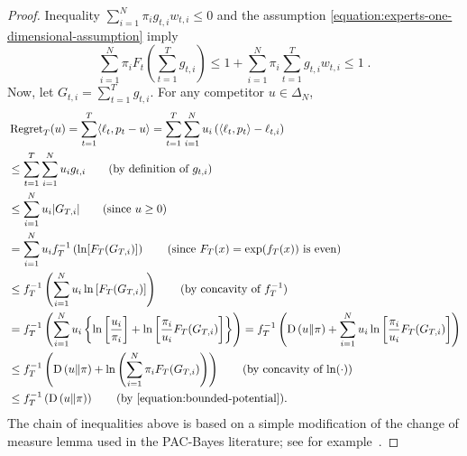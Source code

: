 \begin{proof}
Inequality $\sum_{i=1}^N \pi_i g_{t,i} w_{t,i} \le 0$ and the assumption
\eqref{equation:experts-one-dimensional-assumption} imply
\begin{equation}
\label{equation:bounded-potential}
\sum_{i=1}^N  \pi_i F_t \left(\sum_{t=1}^T g_{t,i} \right) \le 1 + \sum_{i=1}^N \pi_i \sum_{t=1}^T  g_{t,i} w_{t,i} \le 1 \; .
\end{equation}
Now, let $G_{t,i} =
\sum_{t=1}^T g_{t,i}$. For any competitor $u \in \Delta_N$,
\begingroup
\allowdisplaybreaks
\begin{align*}
\allowdisplaybreaks
&\Regret_T(u)
= \sum_{t=1}^T \langle \ell_t, p_t - u \rangle
= \sum_{t=1}^T \sum_{i=1}^N u_i \left( \langle \ell_t, p_t \rangle - \ell_{t,i} \right) \\
& \le \sum_{t=1}^T \sum_{i=1}^N u_i g_{t,i} \qquad \text{(by definition of $g_{t,i}$)} \\
& \le \sum_{i=1}^N u_i |G_{T,i}| \qquad \text{(since $u \ge 0$)}  \\
& = \sum_{i=1}^N u_i f_T^{-1}\left(\ln [F_T(G_{T,i})] \right)  \qquad \text{(since $F_T(x) = \exp(f_T(x))$ is even)} \\
& \le f_T^{-1}\left(\sum_{i=1}^N u_i \ln \left[ F_T(G_{T,i}) \right]\right) \qquad \text{(by concavity of $f_T^{-1}$)} \\
& = f_T^{-1}\left(\sum_{i=1}^N u_i \left\{\ln \left[\frac{u_i}{\pi_i}\right] +\ln \left[ \frac{\pi_i}{u_i} F_T(G_{T,i}) \right] \right\} \right)
= f_T^{-1}\left(\KL{u}{\pi}+\sum_{i=1}^N u_i\ln \left[\frac{\pi_i}{u_i} F_T(G_{T,i}) \right]\right) \\
& \le f_T^{-1}\left(\KL{u}{\pi}+\ln \left(\sum_{i=1}^N \pi_i F_T(G_{T,i}) \right)\right) \qquad \text{(by concavity of $\ln(\cdot)$)} \\
& \le f_T^{-1}\left(\KL{u}{\pi}\right) \qquad \text{(by \eqref{equation:bounded-potential})}.
\end{align*}
\endgroup
The chain of inequalities above is based on a simple modification of the change
of measure lemma used in the PAC-Bayes literature; see for
example~\citet{McAllester-2013}.
\end{proof}
